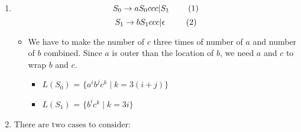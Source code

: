 \documentclass[11pt]{article}
\begin{document}
\begin{solution}
\item
\begin{enumerate}
\item $$S_0 \rightarrow aS_0ccc | S_1 \hspace{8 mm} (1)$$
        $$S_1 \rightarrow bS_1ccc | \epsilon \hspace{9 mm} (2)$$
    \begin{itemize}
        \item We have to make the number of $c$ three times of number of $a$ and number of $b$ combined. Since $a$ is outer than the location of $b$, we need $a$ and $c$ to wrap $b$ and $c$.
        \begin{itemize}
            \item $L(S_0)$ = $\{a^ib^jc^k \mid k = 3(i+j)\}$ \space \space \space
            \item $L(S_1)$ = $\{ b^ic^k \mid k = 3i \}$
        \end{itemize}
    \end{itemize}
\item $\text{There are two cases to consider:}$
    

\end{enumerate}
\end{solution}
\end{document}

